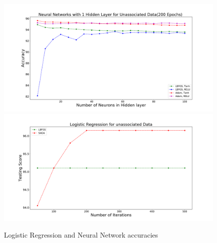 \begin{figure}[h]
\includegraphics[width=\twopicsp\textwidth]{plots/neurons4.pdf}
\includegraphics[width=\twopicsp\textwidth]{plots/solver_unass.pdf}
\caption{Logistic Regression and Neural Network accuracies}
\label{fig:NN_LR_4FGL_accuracy}
\end{figure}

